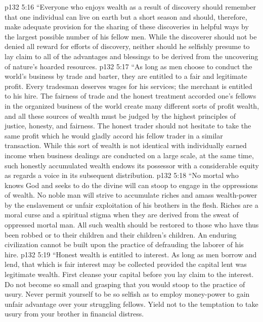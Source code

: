\pc \vs p132 5:16 \textcolor{ubdarkred}{“\bibnobreakspace Everyone who enjoys wealth as a result of discovery should remember that one individual can live on earth but a short season and should, therefore, make adequate provision for the sharing of these discoveries in helpful ways by the largest possible number of his fellow men. While the discoverer should not be denied all reward for efforts of discovery, neither should he selfishly presume to lay claim to all of the advantages and blessings to be derived from the uncovering of nature’s hoarded resources.}
\pc \vs p132 5:17 \textcolor{ubdarkred}{“\bibnobreakspace As long as men choose to conduct the world’s business by trade and barter, they are entitled to a fair and legitimate profit. Every tradesman deserves wages for his services; the merchant is entitled to his hire. The fairness of trade and the honest treatment accorded one’s fellows in the organized business of the world create many different sorts of profit wealth, and all these sources of wealth must be judged by the highest principles of justice, honesty, and fairness. The honest trader should not hesitate to take the same profit which he would gladly accord his fellow trader in a similar transaction. While this sort of wealth is not identical with individually earned income when business dealings are conducted on a large scale, at the same time, such honestly accumulated wealth endows its possessor with a considerable equity as regards a voice in its subsequent distribution.}
\pc \vs p132 5:18 \textcolor{ubdarkred}{“\bibnobreakspace No mortal who knows God and seeks to do the divine will can stoop to engage in the oppressions of wealth. No noble man will strive to accumulate riches and amass wealth\hyp{}power by the enslavement or unfair exploitation of his brothers in the flesh. Riches are a moral curse and a spiritual stigma when they are derived from the sweat of oppressed mortal man. All such wealth should be restored to those who have thus been robbed or to their children and their children’s children. An enduring civilization cannot be built upon the practice of defrauding the laborer of his hire.}
\pc \vs p132 5:19 \textcolor{ubdarkred}{“\bibnobreakspace Honest wealth is entitled to interest. As long as men borrow and lend, that which is fair interest may be collected provided the capital lent was legitimate wealth. First cleanse your capital before you lay claim to the interest. Do not become so small and grasping that you would stoop to the practice of usury. Never permit yourself to be so selfish as to employ money\hyp{}power to gain unfair advantage over your struggling fellows. Yield not to the temptation to take usury from your brother in financial distress.}
